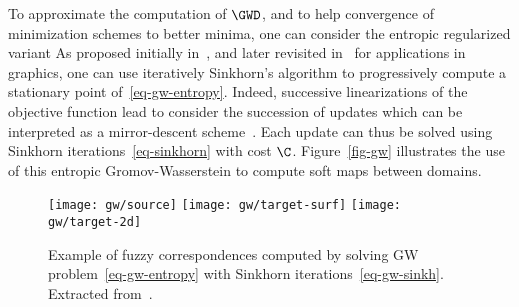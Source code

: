 To approximate the computation of $\GWD$, and to help convergence of minimization schemes to better minima, one can consider the entropic regularized variant
As proposed initially in~\cite{gold-1996,rangarajan-1999}, and later revisited in~\cite{2016-solomon-gw} for applications in graphics, one can use iteratively Sinkhorn's algorithm to progressively compute a stationary point of~\eqref{eq-gw-entropy}. 
%
Indeed, successive linearizations of the objective function lead to consider the succession of updates
\eql{\label{eq-gw-sinkh}
	\itt{\P} \eqdef \umin{ \P \in \CouplingsD(\a,\b) } \dotp{\P}{\it{\C}} - \epsilon\H(\P)
		\qwhereq
}
which can be interpreted as a mirror-descent scheme~\cite{2016-solomon-gw}. Each update can thus be solved using Sinkhorn iterations~\eqref{eq-sinkhorn} with cost $\it{\C}$. Figure~\eqref{fig-gw} illustrates the use of this entropic Gromov-Wasserstein to compute soft maps between domains. 


\begin{figure}
\centering
\texttt{[image: gw/source]}
\texttt{[image: gw/target-surf]}
\texttt{[image: gw/target-2d]}
\caption{\label{fig-gw}
Example of fuzzy correspondences computed by solving GW problem~\eqref{eq-gw-entropy} with Sinkhorn iterations~\eqref{eq-gw-sinkh}. Extracted from~\cite{2016-solomon-gw}.
}
\end{figure}

